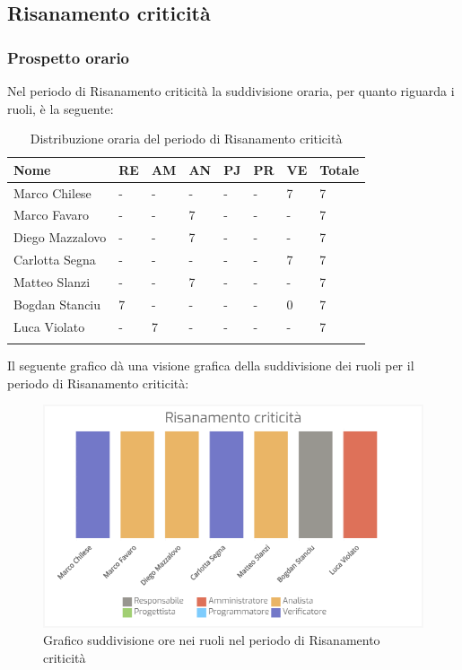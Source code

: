 \subsection{Risanamento criticità}
\subsubsection{Prospetto orario}

Nel periodo di Risanamento criticità la suddivisione oraria, per quanto riguarda i ruoli, è la seguente:

\begin{longtable}{|C{.30\textwidth}|C{.06\textwidth}|C{.06\textwidth}|C{.06\textwidth} | C{.06\textwidth}| C{.06\textwidth} | C{.06\textwidth} | C{.10\textwidth} |}
\hline
\textbf{Nome} & \textbf{RE} & \textbf{AM} & \textbf{AN} & \textbf{PJ} & \textbf{PR} & \textbf{VE} & \textbf{Totale}\\
\hline 
Marco Chilese & - & - & - & - & - & 7 & 7 \\
\hline
Marco Favaro & - & - & 7 & - & - & - & 7 \\
\hline
Diego Mazzalovo & - & - & 7 & - & - & - & 7 \\
\hline
Carlotta Segna & - & - & - & - & - & 7 & 7 \\
\hline
Matteo Slanzi & - & - & 7 & - & - & - & 7 \\
\hline
Bogdan Stanciu & 7 & - & - & - & - & 0 & 7 \\
\hline
Luca Violato & - & 7 & - & - & - & - & 7 \\
\hline

\caption{Distribuzione oraria del periodo di Risanamento criticità}
\label{Distribuzione oraria del periodo di Risanamento criticità}
\end{longtable}



Il seguente grafico dà una visione grafica della suddivisione dei ruoli per il periodo di Risanamento criticità:
\begin{figure}[H]
  \centering
  \includegraphics[width=1\linewidth]{./images/risanemento_criticita1.png}
  \caption{Grafico suddivisione ore nei ruoli nel periodo di Risanamento criticità}
  \label{fig:grafico suddivione ruoli nel periodo di Risanamento criticità}
\end{figure}

